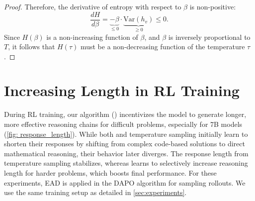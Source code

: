 \begin{proof}
Therefore, the derivative of entropy with respect to $\beta$ is non-positive:
\[
\frac{dH}{d\beta} = \underbrace{-\beta}_{\le 0} \cdot \underbrace{\mathrm{Var}(h_v)}_{\ge 0} \le 0.
\]
Since $H(\beta)$ is a non-increasing function of $\beta$, and $\beta$ is inversely proportional to $T$, it follows that $H(\tau)$ must be a non-decreasing function of the temperature $\tau$.
\end{proof}

\section{Increasing Length in RL Training}
\label{app: increased_length}
During RL training, our algorithm (\alg) incentivizes the model to generate longer, more effective reasoning chains for difficult problems, especially for 7B models (\cref{fig: response_length}). While both \alg and temperature sampling initially learn to shorten their responses by shifting from complex code-based solutions to direct mathematical reasoning, their behavior later diverges. The response length from temperature sampling stabilizes, whereas \alg learns to selectively increase reasoning length for harder problems, which boosts final performance. For these experiments, EAD is applied in the DAPO algorithm for sampling rollouts. We use the same training setup as detailed in \cref{sec:experiments}. 

